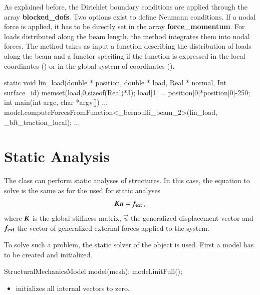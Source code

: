 As explained before, the Dirichlet boundary conditions are applied through the
array \textbf{blocked\_dofs}. Two options exist to define Neumann conditions.
If a nodal force is applied, it has to be directly set in the array
\textbf{force\_momentum}. For loads distributed along the beam length, the
method  integrates them into nodal forces.  The
method takes as input a function describing the distribution of loads along the
beam and a functor  specifing if the function is
expressed in the local coordinates () or in the
global system of coordinates ().
\begin{cpp}
 static void lin_load(double * position, double * load,
		      Real * normal, Int surface_id){
  memset(load,0,sizeof(Real)*3);
  load[1] = position[0]*position[0]-250;
}
int main(int argc, char *argv[]){
...
model.computeForcesFromFunction<_bernoulli_beam_2>(lin_load,
                                                   _bft_traction_local);
...}
\end{cpp}


\section{Static Analysis\label{sect:structMechMod:static}}

The  class can perform static analyses
of structures.  In this case, the equation to solve is the same as for
the  used for static analyses
\begin{equation}\label{eqn:structMechMod:static}
  \boldsymbol{K} \boldsymbol{u} = \boldsymbol{f_{{\mathrm{ext}}}}~,
\end{equation}
where $\boldsymbol{K}$ is the global stiffness matrix, $\vec{u}$ the
generalized displacement vector and $\boldsymbol{f_{{\mathrm{ext}}}}$ the vector of
generalized external forces applied to the system.

To solve such a problem, the static solver of the
 object
is used.  First a model has to be created and initialized.

\begin{cpp}
  StructuralMechanicsModel model(mesh);
  model.initFull();
\end{cpp}


\begin{itemize}
\item {} initializes all internal vectors to zero.
\end{itemize}


